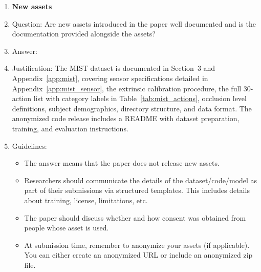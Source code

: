 \begin{enumerate}
\item {\bf New assets}
    \item[] Question: Are new assets introduced in the paper well documented and is the documentation provided alongside the assets?
    \item[] Answer: \answerYes{}
    \item[] Justification: The MIST dataset is documented in Section~3 and Appendix~\ref{app:mist}, covering sensor specifications detailed in Appendix~\ref{app:mist_sensor}, the extrinsic calibration procedure, the full 30-action list with category labels in Table~\ref{tab:mist_actions}, occlusion level definitions, subject demographics, directory structure, and data format. The anonymized code release includes a README with dataset preparation, training, and evaluation instructions.
    \item[] Guidelines:
    \begin{itemize}
        \item The answer \answerNA{} means that the paper does not release new assets.
        \item Researchers should communicate the details of the dataset\slash code\slash model as part of their submissions via structured templates. This includes details about training, license, limitations, etc.
        \item The paper should discuss whether and how consent was obtained from people whose asset is used.
        \item At submission time, remember to anonymize your assets (if applicable). You can either create an anonymized URL or include an anonymized zip file.
    \end{itemize}


\end{enumerate}
